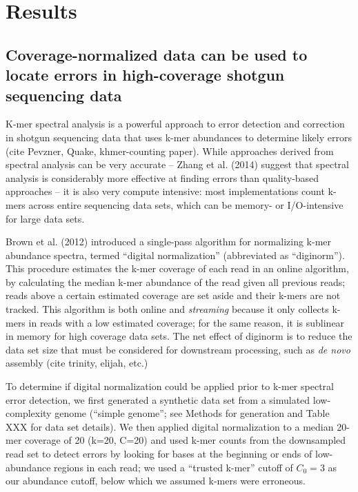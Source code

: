 



\section{Results}

\subsection{Coverage-normalized data can be used to locate
errors in high-coverage shotgun sequencing data}

K-mer spectral analysis is a powerful approach to error detection and
correction in shotgun sequencing data that uses k-mer abundances to
determine likely errors (cite Pevzner, Quake, khmer-counting paper).
While approaches derived from spectral analysis can be very accurate
-- Zhang et al. (2014) suggest that spectral analysis is considerably
more effective at finding errors than quality-based approaches -- it
is also very compute intensive: most implementations count k-mers
across entire sequencing data sets, which can be memory- or
I/O-intensive for large data sets.

Brown et al. (2012) introduced a single-pass algorithm for normalizing
k-mer abundance spectra, termed ``digital normalization'' (abbreviated
as ``diginorm'').  This procedure estimates the k-mer coverage of each
read in an online algorithm, by calculating the median k-mer abundance
of the read given all previous reads; reads above a certain estimated
coverage are set aside and their k-mers are not tracked.  This
algorithm is both online and {\em streaming} because it only collects
k-mers in reads with a low estimated coverage; for the same reason, it
is sublinear in memory for high coverage data sets.  The net effect of
diginorm is to reduce the data set size that must be considered for
downstream processing, such as {\em de novo} assembly (cite trinity,
elijah, etc.)

To determine if digital normalization could be applied prior to k-mer
spectral error detection, we first generated a synthetic data set from
a simulated low-complexity genome (``simple genome''; see Methods for
generation and Table XXX for data set details).  We then applied
digital normalization to a median 20-mer coverage of 20 (k=20, C=20)
and used k-mer counts from the downsampled read set to detect errors
by looking for bases at the beginning or ends of low-abundance regions
in each read; we used a ``trusted k-mer'' cutoff of $C_0 = 3$ as our
abundance cutoff, below which we assumed k-mers were erroneous.

